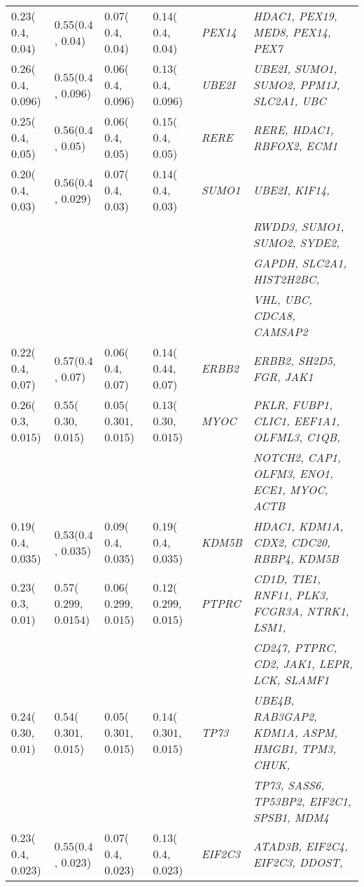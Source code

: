\documentclass[10pt]{article}
\begin{document}
\begin{landscape}
\begin{table}[!htbp]
{\begin{tabular}{l l l l |l l}
$0.23$($0.4$, $0.04$) & $0.55$($0.4$, $0.04$) & $0.07$($0.4$, $0.04$) & $0.14$($0.4$, $0.04$) & \textit{PEX14} & \textit{HDAC1, PEX19, MED8, PEX14, PEX7} \\[2pt]

$0.26$($0.4$, $0.096$) & $0.55$($0.4$, $0.096$) & $0.06$($0.4$, $0.096$) & $0.13$($0.4$, $0.096$) & \textit{UBE2I} & \textit{UBE2I, SUMO1, SUMO2, PPM1J, SLC2A1, UBC} \\[2pt]
$0.25$($0.4$, $0.05$) & $0.56$($0.4$, $0.05$) & $0.06$($0.4$, $0.05$) & $0.15$($0.4$, $0.05$) & \textit{RERE} & \textit{RERE, HDAC1, RBFOX2, ECM1} \\[2pt]
$0.20$($0.4$, $0.03$) & $0.56$($0.4$, $0.029$) & $0.07$($0.4$, $0.03$) & $0.14$($0.4$, $0.03$) & \textit{SUMO1} & \textit{UBE2I, KIF14,} \\[2pt]
&&&&&\textit{RWDD3, SUMO1, SUMO2, SYDE2,} \\[2pt]
&&&&&\textit{GAPDH, SLC2A1, HIST2H2BC,} \\[2pt] 
&&&&&\textit{VHL, UBC, CDCA8, CAMSAP2} \\[2pt]
$0.22$($0.4$, $0.07$) & $0.57$($0.4$, $0.07$) & $0.06$($0.4$, $0.07$) & $0.14$($0.44$, $0.07$) & \textit{ERBB2} & \textit{ERBB2, SH2D5, FGR, JAK1} \\[2pt]
$0.26$($0.3$, $0.015$) & $0.55$($0.30$, $0.015$) & $0.05$($0.301$, $0.015$) & $0.13$($0.30$, $0.015$) & \textit{MYOC} & \textit{PKLR, FUBP1, CLIC1, EEF1A1, OLFML3, C1QB,} \\[2pt]
&&&&&\textit{NOTCH2, CAP1, OLFM3, ENO1, ECE1, MYOC, ACTB} \\[2pt]
$0.19$($0.4$, $0.035$) & $0.53$($0.4$, $0.035$) & $0.09$($0.4$, $0.035$) & $0.19$($0.4$, $0.035$) & \textit{KDM5B} & \textit{HDAC1, KDM1A, CDX2, CDC20, RBBP4, KDM5B} \\[2pt]
$0.23$($0.3$, $0.01$) & $0.57$($0.299$, $0.0154$) & $0.06$($0.299$, $0.015$) & $0.12$($0.299$, $0.015$) & \textit{PTPRC} & \textit{CD1D, TIE1, RNF11, PLK3, FCGR3A, NTRK1, LSM1,} \\[2pt]
&&&&&\textit{CD247, PTPRC, CD2, JAK1, LEPR, LCK, SLAMF1} \\[2pt]
$0.24$($0.30$, $0.01$) & $0.54$($0.301$, $0.015$) & $0.05$($0.301$, $0.015$) & $0.14$($0.301$, $0.015$) & \textit{TP73} & \textit{UBE4B, RAB3GAP2, KDM1A, ASPM, HMGB1, TPM3, CHUK,} \\[2pt] 
&&&&&\textit{TP73, SASS6, TP53BP2, EIF2C1, SPSB1, MDM4} \\[2pt]
$0.23$($0.4$, $0.023$) & $0.55$($0.4$, $0.023$) & $0.07$($0.4$, $0.023$) & $0.13$($0.4$, $0.023$) & \textit{EIF2C3} & \textit{ATAD3B, EIF2C4, EIF2C3, DDOST,} \\[2pt] 

\end{tabular}}
\end{table}
\end{landscape}
\end{document}
